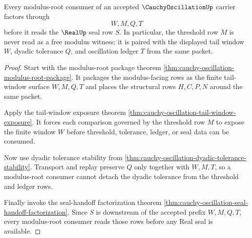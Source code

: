 \begin{theorem}
\label{thm:cauchy-oscillation-modulus-threshold-exactness}
Every modulus-root consumer of an accepted $\CauchyOscillationUp$ carrier factors through
$$
W,M,Q,T
$$
before it reads the $\RealUp$ seal row $S$. In particular, the threshold row $M$ is never read as a free modulus witness: it is paired with the displayed tail window $W$, dyadic tolerance $Q$, and oscillation ledger $T$ from the same packet.
\end{theorem}
\begin{proof}
Start with the modulus-root package theorem \autoref{thm:cauchy-oscillation-modulus-root-package}. It packages the modulus-facing rows as the finite tail-window surface $W,M,Q,T$ and places the structural rows $H,C,P,N$ around the same packet.

Apply the tail-window exposure theorem \autoref{thm:cauchy-oscillation-tail-window-exposure}. It forces each comparison governed by the threshold row $M$ to expose the finite window $W$ before threshold, tolerance, ledger, or seal data can be consumed.

Now use dyadic tolerance stability from \autoref{thm:cauchy-oscillation-dyadic-tolerance-stability}. Transport and replay preserve $Q$ only together with $W,M,T$, so a modulus-root consumer cannot detach the dyadic tolerance from the threshold and ledger rows.

Finally invoke the seal-handoff factorization theorem \autoref{thm:cauchy-oscillation-seal-handoff-factorization}. Since $S$ is downstream of the accepted prefix $W,M,Q,T$, every modulus-root consumer reads those rows before any Real seal is available.
\end{proof}

